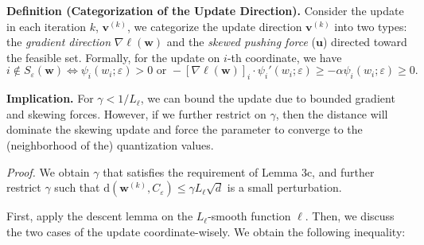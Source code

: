 \documentclass[10pt,a4paper]{article}
\begin{document}

\textbf{Definition (Categorization of the Update Direction).} Consider the update in each iteration $k$, $\mathbf{v}^{(k)}$, we categorize the update direction $\mathbf{v}^{(k)}$ into two types: the \textit{gradient direction} $\nabla\ell(\mathbf{w})$ and the \textit{skewed pushing force} ($\mathbf{u}$) directed toward the feasible set. Formally, for the update on $i$-th coordinate, we have \[ i\notin S_\varepsilon(\mathbf{w}) \Longleftrightarrow \psi_i(w_i;\varepsilon)>0 \text{ or }-[\nabla\ell(\mathbf{w})]_i\cdot \psi_i'(w_i;\varepsilon)\geq -\alpha \psi_i(w_i;\varepsilon)\geq 0.\] 

\textbf{Implication.} For $\gamma<1/L_\ell$, we can bound the update due to bounded gradient and skewing forces. However, if we further restrict on $\gamma$, then the distance will dominate the skewing update and force the parameter to converge to the (neighborhood of the) quantization values.

\newpage
\textit{Proof.} We obtain $\gamma$ that satisfies the requirement of Lemma 3c, and further restrict $\gamma$ such that $\text{d}(\mathbf{w}^{(k)}, C_\varepsilon)\leq \gamma L_\ell \sqrt{d}$ is a small perturbation.

First, apply the descent lemma on the $L_\ell$-smooth function $\ell$. Then, we discuss the two cases of the update coordinate-wisely. We obtain the following inequality:
\end{document}
